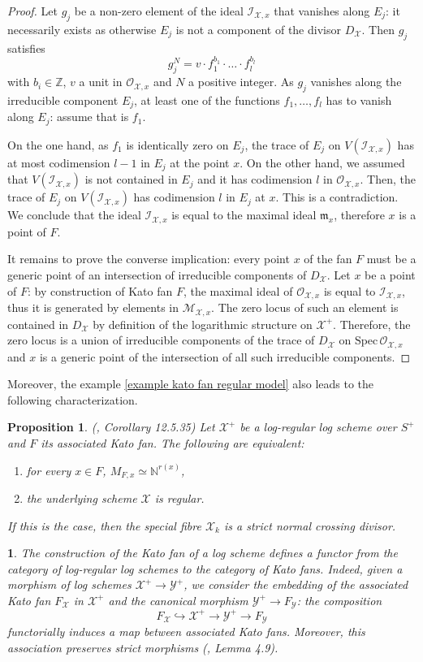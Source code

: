 \documentclass{amsart}%
\numberwithin{equation}{subsection}
\theoremstyle{plain2}
\newtheorem{prop}[equation]{Proposition}
\theoremstyle{definition2}
\theoremstyle{stepstyle}
\theoremstyle{point}
\theoremstyle{subpoint}
\newtheorem{subpoint}[equation]{}%
\newcommand{\spa}[1]{\begin{subpoint}#1\end{subpoint}}           %
\newcommand{\N}{\ensuremath{\mathbb{N}}}
\newcommand{\Z}{\ensuremath{\mathbb{Z}}}
\newcommand{\cX}{\ensuremath{\mathscr{X}}}
\newcommand{\caO}{\ensuremath{\mathcal{O}}}
\newcommand{\caI}{\ensuremath{\mathcal{I}}}
\newcommand{\cY}{\ensuremath{\mathscr{Y}}}
\renewcommand{\cY}{\ensuremath{\mathscr{Y}}}
\newcommand{\Spec}{\ensuremath{\mathrm{Spec}\,}}
\begin{document}
\begin{proof}
Let $g_j$ be a non-zero element of the ideal $\caI_{\cX,x}$ that vanishes along $E_j$: it necessarily exists as otherwise $E_j$ is not a component of the divisor $D_{\cX}$. Then $g_j$ satisfies $$g_{j}^N = v \cdot f_1^{b_1} \cdot \ldots \cdot f_l^{b_l}$$ with $b_i \in \Z$, $v$ a unit in $\caO_{\cX,x}$ and $N$ a positive integer. As $g_j$ vanishes along the irreducible component $E_j$, at least one of the functions $f_1,\ldots,f_l$ has to vanish along $E_j$: assume that is $f_1$.

On the one hand, as $f_1$ is identically zero on $E_j$, the trace of $E_j$ on $V(\caI_{\cX,x})$ has at most codimension $l-1$ in $E_j$ at the point $x$. On the other hand, we assumed that $V(\caI_{\cX,x})$ is not contained in $E_j$ and it has codimension $l$ in $\caO_{\cX,x}$. Then, the trace of $E_j$ on $V(\caI_{\cX,x})$ has codimension $l$ in $E_j$ at $x$. This is a contradiction. We conclude that the ideal $\caI_{\cX,x}$ is equal to the maximal ideal $\mathfrak{m}_x$, therefore $x$ is a point of $F$.

It remains to prove the converse implication: every point $x$ of the fan $F$ must be a generic point of an intersection of irreducible components of $D_{\cX}$. Let $x$ be a point of $F$: by construction of Kato fan $F$, the maximal ideal of $\mathcal{O}_{\cX,x}$ is equal to $\mathcal{I}_{\cX,x}$, thus it is generated by elements in $\mathcal{M}_{\cX,x}$. The zero locus of such an element is contained in $D_{\cX}$ by definition of the logarithmic structure on $\cX^+$. Therefore, the zero locus is a union of irreducible components of the trace of $D_{\cX}$ on $\Spec \mathcal{O}_{\cX,x}$ and $x$ is a generic point of the intersection of all such irreducible components.
\end{proof}

Moreover, the example \ref{example kato fan regular model} also leads to the following characterization.

\begin{prop} \label{resolution log scheme kato fan} (\cite{GabberRamero}, Corollary 12.5.35)
Let $\cX^+$ be a log-regular log scheme over $S^+$ and $F$ its associated Kato fan. The following are equivalent: \begin{enumerate}
\item for every $x \in F$, $M_{F,x} \simeq \N^{r(x)}$,
\item the underlying scheme $\cX$ is regular.
\end{enumerate}
If this is the case, then the special fibre $\cX_k$ is a strict normal crossing divisor.
\end{prop}
\spa{The construction of the Kato fan of a log scheme defines a functor from the category of log-regular log schemes to the category of Kato fans. Indeed, given a morphism of log schemes $\cX^+ \rightarrow \cY^+$, we consider the embedding of the associated Kato fan $F_{\cX}$ in $\cX^+$ and the canonical morphism $\cY^+ \rightarrow F_{\cY}$: the composition $$F_{\cX} \hookrightarrow \cX^+ \rightarrow \cY^+ \rightarrow F_\cY$$ functorially induces a map between associated Kato fans. Moreover, this association preserves strict morphisms (\cite{Ulirsch2013}, Lemma 4.9).}
\end{document}
